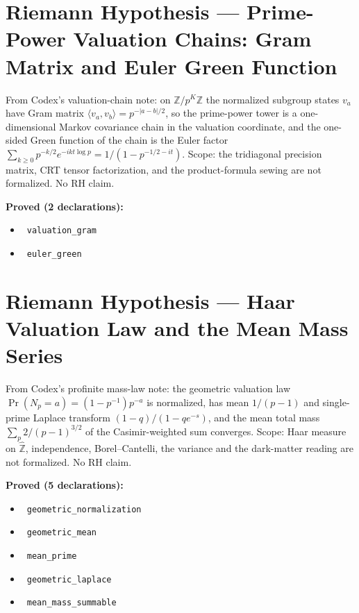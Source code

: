\documentclass{report}
\theoremstyle{definition}
\begin{document}
\section{Riemann Hypothesis --- Prime-Power Valuation Chains: Gram Matrix and Euler Green Function}
From Codex's valuation-chain note: on $\mathbb{Z}/p^K\mathbb{Z}$ the normalized subgroup states $v_a$ have Gram matrix $\langle v_a,v_b\rangle=p^{-|a-b|/2}$, so the prime-power tower is a one-dimensional Markov covariance chain in the valuation coordinate, and the one-sided Green function of the chain is the Euler factor $\sum_{k\ge0}p^{-k/2}e^{-ikt\log p}=1/(1-p^{-1/2-it})$. Scope: the tridiagonal precision matrix, CRT tensor factorization, and the product-formula sewing are not formalized. No RH claim.

\noindent\textbf{Proved (2 declarations):}
\begin{itemize}
  \item {}\leanok\ \texttt{valuation\_gram}
  \item {}\leanok\ \texttt{euler\_green}
\end{itemize}

\section{Riemann Hypothesis --- Haar Valuation Law and the Mean Mass Series}
From Codex's profinite mass-law note: the geometric valuation law $\Pr(N_p=a)=(1-p^{-1})p^{-a}$ is normalized, has mean $1/(p-1)$ and single-prime Laplace transform $(1-q)/(1-qe^{-s})$, and the mean total mass $\sum_p 2/(p-1)^{3/2}$ of the Casimir-weighted sum converges. Scope: Haar measure on $\widehat{\mathbb Z}$, independence, Borel--Cantelli, the variance and the dark-matter reading are not formalized. No RH claim.

\noindent\textbf{Proved (5 declarations):}
\begin{itemize}
  \item {}\leanok\ \texttt{geometric\_normalization}
  \item {}\leanok\ \texttt{geometric\_mean}
  \item {}\leanok\ \texttt{mean\_prime}
  \item {}\leanok\ \texttt{geometric\_laplace}
  \item {}\leanok\ \texttt{mean\_mass\_summable}
\end{itemize}
\end{document}
